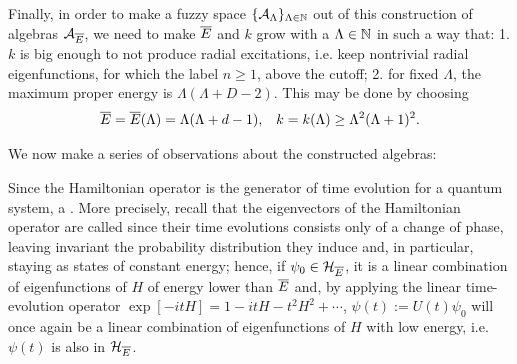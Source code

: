 Finally, in order to make a fuzzy space $\{\mathcal A_\Lambda\}_{\Lambda \in \mathbb{N}}$ out of this construction of algebras $\mathcal A_{\overline{E}}$, we need to make $\overline{E}$ and $k$ grow with a $\Lambda \in \mathbb{N}$ in such a way that: 1. $k$ is big enough to not produce radial excitations, i.e. keep nontrivial radial eigenfunctions, for which the label $n \geq 1$, above the cutoff; 2. for fixed $\Lambda$, the maximum proper energy is $\Lambda(\Lambda + D - 2)$. This may be done by choosing 
\begin{align}
    \overline{E} = \overline{E}(\Lambda) &= \Lambda(\Lambda + d - 1), & k = k(\Lambda) \geq \Lambda^2(\Lambda + 1)^2.
\end{align}

\lin 

We now make a series of observations about the constructed algebras:

\begin{remark}
Since the Hamiltonian operator is the generator of time evolution for a quantum system, a . More precisely, recall that the eigenvectors of the Hamiltonian operator are called  since their time evolutions consists only of a change of phase, leaving invariant the probability distribution they induce and, in particular, staying as states of constant energy; 
hence, if $\psi_0 \in \mathcal H_{\overline{E}}$, it is a linear combination of eigenfunctions of $H$ of energy lower than $\overline{E}$ and, by applying the linear time-evolution operator $\exp[-itH] = 1 - itH - t^2 H^2 + \cdots$, $\psi(t) := U(t) \psi_0$ will once again be a linear combination of eigenfunctions of $H$ with low energy, i.e. $\psi(t)$ is also in $\mathcal H_{\overline{E}}$.
\end{remark}

